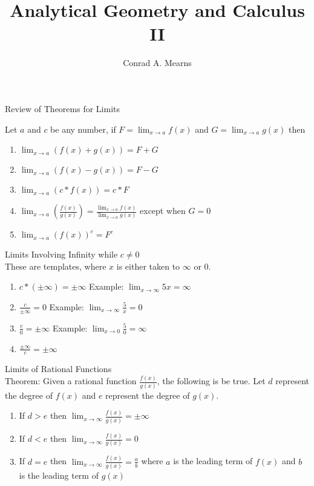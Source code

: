 \documentclass{article}
\title{Analytical Geometry and Calculus II}
\author{Conrad A. Mearns}
\begin{document}
\maketitle

\noindent
\Large
Review of Theorems for Limits\\
\normalsize

\noindent
Let $a$ and $c$ be any number, if $F = \lim_{x \to a}f(x)$ and $G = \lim_{x \to a}g(x)$ then

\begin{enumerate}
  \item $\lim_{x \to a}(f(x) + g(x)) = F + G$
  \item $\lim_{x \to a}(f(x) - g(x)) = F - G$
  \item $\lim_{x \to a}(c * f(x)) = c * F$
  \item $\lim_{x \to a}(\frac{f(x)}{g(x)}) = \frac{\lim_{x \to a}f(x)}{\lim_{x \to a}g(x)}$ except when $G = 0$
  \item $\lim_{x \to a}(f(x))^c = F^c$
\end{enumerate}

\noindent
\Large
Limits Involving Infinity while $c \neq 0$\\
\normalsize
\noindent
These are templates, where $x$ is either taken to $\infty$ or 0.

\begin{enumerate}
  \item $c * (\pm \infty) = \pm \infty$ Example: $\lim_{x \to \infty}5x = \infty$
  \item $\frac{c}{\pm \infty} = 0$ Example: $\lim_{x \to \infty}\frac{5}{x} = 0$
  \item $\frac{c}{0} = \pm \infty$ Example: $\lim_{x \to 0}\frac{5}{0} = \infty$
  \item $\frac{\pm \infty}{c} = \pm \infty$
\end{enumerate}


\noindent
\Large
Limits of Rational Functions\\
\normalsize
\noindent
Theorem: Given a rational function $\frac{f(x)}{g(x)}$, the following is be true.
Let $d$ represent the degree of $f(x)$ and $e$ represent the degree of $g(x)$.\\
\begin{enumerate}
  \item If $d > e$ then $\lim_{x \to \infty}\frac{f(x)}{g(x)} = \pm \infty$
  \item If $d < e$ then $\lim_{x \to \infty}\frac{f(x)}{g(x)} = 0$
  \item If $d = e$ then $\lim_{x \to \infty}\frac{f(x)}{g(x)} = \frac{a}{b}$ where $a$ is the leading term of $f(x)$ and $b$ is the leading term of $g(x)$
\end{enumerate}
\end{document}
